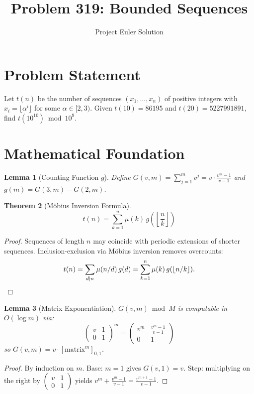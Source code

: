 \documentclass[12pt]{article}
\title{Problem 319: Bounded Sequences}
\author{Project Euler Solution}
\date{}
\newtheorem{theorem}{Theorem}
\newtheorem{lemma}[theorem]{Lemma}
\begin{document}
\maketitle

\section{Problem Statement}

Let $t(n)$ be the number of sequences $(x_1, \ldots, x_n)$ of positive integers with $x_i = \lfloor \alpha^i \rfloor$ for some $\alpha \in [2,3)$. Given $t(10) = 86195$ and $t(20) = 5227991891$, find $t(10^{10}) \bmod 10^9$.

\section{Mathematical Foundation}

\begin{lemma}[Counting Function $g$]
Define $G(v,m) = \sum_{j=1}^{m} v^j = v\cdot\frac{v^m - 1}{v-1}$ and $g(m) = G(3,m) - G(2,m)$.
\end{lemma}

\begin{theorem}[M\"obius Inversion Formula]
\[
    t(n) = \sum_{k=1}^{n} \mu(k)\, g\!\left(\!\left\lfloor \frac{n}{k}\right\rfloor\!\right)
\]
\end{theorem}

\begin{proof}
Sequences of length $n$ may coincide with periodic extensions of shorter sequences. Inclusion-exclusion via M\"obius inversion removes overcounts:
\[
    t(n) = \sum_{d \mid n} \mu(n/d)\,g(d) = \sum_{k=1}^{n}\mu(k)\,g(\lfloor n/k\rfloor). \qedhere
\]
\end{proof}

\begin{lemma}[Matrix Exponentiation]
$G(v,m) \bmod M$ is computable in $O(\log m)$ via:
\[
    \begin{pmatrix} v & 1 \\ 0 & 1 \end{pmatrix}^m = \begin{pmatrix} v^m & \frac{v^m-1}{v-1} \\ 0 & 1 \end{pmatrix}
\]
so $G(v,m) = v \cdot [\text{matrix}^m]_{0,1}$.
\end{lemma}

\begin{proof}
By induction on $m$. Base: $m=1$ gives $G(v,1) = v$. Step: multiplying on the right by $\begin{pmatrix} v & 1 \\ 0 & 1 \end{pmatrix}$ yields $v^m + \frac{v^m-1}{v-1} = \frac{v^{m+1}-1}{v-1}$.
\end{proof}
\end{document}
